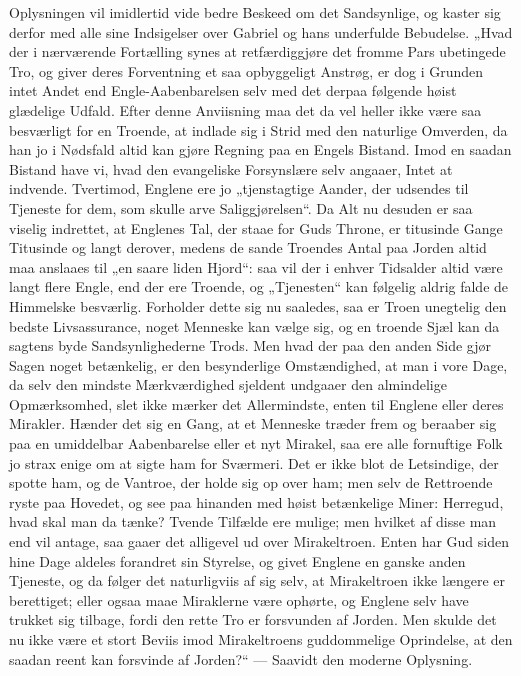 \documentclass[12pt,a4paper]{book}
\begin{document}
Oplysningen vil imidlertid vide bedre Beskeed om det Sandsynlige, og
kaster sig derfor med alle sine Indsigelser over Gabriel og hans
underfulde Bebudelse. „Hvad der i nærværende Fortælling synes at
retfærdiggjøre det fromme Pars ubetingede Tro, og giver deres Forventning
et saa opbyggeligt Anstrøg, er dog i
Grunden intet Andet end Engle-Aabenbarelsen selv med det derpaa følgende
høist glædelige Udfald. Efter denne Anviisning maa det da vel heller ikke
være saa besværligt for en Troende, at indlade sig i Strid med den
naturlige Omverden, da han jo i Nødsfald altid kan gjøre Regning paa en
Engels Bistand. Imod en saadan Bistand have vi, hvad den evangeliske
Forsynslære selv angaaer, Intet at indvende. Tvertimod, Englene ere jo
„tjenstagtige Aander, der udsendes til Tjeneste for dem, som skulle arve
Saliggjørelsen“. Da Alt nu desuden er saa viselig indrettet, at Englenes
Tal, der staae for Guds Throne, er titusinde Gange Titusinde og langt
derover, medens de sande Troendes Antal paa Jorden altid maa anslaaes til
„en saare liden Hjord“: saa vil der i enhver Tidsalder altid være langt
flere Engle, end der ere Troende, og „Tjenesten“ kan følgelig aldrig
falde de Himmelske besværlig. Forholder dette sig nu saaledes, saa er
Troen unegtelig den bedste Livsassurance, noget Menneske kan vælge sig,
og en troende Sjæl kan da sagtens byde Sandsynlighederne Trods. Men hvad
der paa den anden Side gjør Sagen noget betænkelig, er den besynderlige
Omstændighed, at man i vore Dage, da selv den mindste Mærkværdighed
sjeldent undgaaer den almindelige Opmærksomhed, slet ikke mærker det
Allermindste, enten til Englene eller deres Mirakler. Hænder det sig en
Gang, at et Menneske træder frem og beraaber sig paa en umiddelbar
Aabenbarelse eller et nyt Mirakel, saa ere alle fornuftige Folk jo strax
enige om at sigte ham for Sværmeri. Det er ikke blot de Letsindige, der
spotte ham, og de Vantroe, der holde sig op over ham; men selv de
Rettroende ryste paa Hovedet, og see paa hinanden med høist betænkelige
Miner: Herregud, hvad skal man da tænke? Tvende Tilfælde ere mulige; men
hvilket af disse man end vil antage, saa gaaer det alligevel ud over
Mirakeltroen. Enten har Gud siden hine Dage aldeles forandret sin
Styrelse, og givet Englene en ganske anden Tjeneste, og da følger det
naturligviis af sig selv, at Mirakeltroen ikke længere er berettiget;
eller ogsaa maae Miraklerne være ophørte, og Englene selv have trukket
sig tilbage, fordi den rette Tro er forsvunden af Jorden. Men skulde det
nu ikke være et stort Beviis imod Mirakeltroens guddommelige Oprindelse,
at den saadan reent kan forsvinde af Jorden?“ --- Saavidt den moderne
Oplysning.
\end{document}
